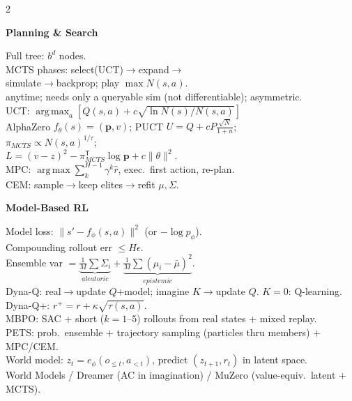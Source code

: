 \documentclass[a4paper]{article}
\newcommand{\hd}[1]{%
  \par\addvspace{3.6pt}%
  {\color{accent}\bfseries\small #1}\par
  \vspace{-4pt}{\color{accent!45}\rule{\linewidth}{0.4pt}}\par\vspace{1.2pt}}
\newcommand{\argmax}{\operatorname*{arg\,max}}
\newcommand{\T}{^{\mathsf{T}}}
\newcommand{\norm}[1]{\lVert #1 \rVert}
\begin{document}
\begin{multicols}{2}
\hd{Planning \& Search}
Full tree: $b^d$ nodes.\\
MCTS phases: select(UCT)$\to$expand$\to$\\simulate$\to$backprop; play $\max N(s,a)$.\\
anytime; needs only a queryable sim (not differentiable); asymmetric.\\
UCT: $\argmax_a[Q(s,a)+c\sqrt{\ln N(s)/N(s,a)}]$\\
AlphaZero $f_\theta(s){=}(\mathbf p,v)$; PUCT $U=Q+cP\frac{\sqrt N}{1+n}$;\\
$\pi_{MCTS}\propto N(s,a)^{1/\tau}$;\\
$L=(v-z)^2-\pi_{MCTS}\T\log\mathbf p+c\norm\theta^2$.\\
MPC: $\argmax\sum_{k}^{H-1}\gamma^k\hat r$, exec.\ first action, re-plan.\\
CEM: sample$\to$keep elites$\to$refit $\mu,\Sigma$.

\hd{Model-Based RL}
Model loss: $\norm{s'-f_\phi(s,a)}^2$ (or $-\log p_\phi$).\\
Compounding rollout err $\le H\epsilon$.\\
Ensemble var $=\underbrace{\tfrac1M\sum\Sigma_i}_{aleatoric}+\underbrace{\tfrac1M\sum(\mu_i-\bar\mu)^2}_{epistemic}$.\\
Dyna-Q: real$\to$update $Q$+model; imagine $K$$\to$update $Q$. $K{=}0$: Q-learning.\\
Dyna-Q+: $r^+=r+\kappa\sqrt{\tau(s,a)}$.\\
MBPO: SAC + short ($k{=}1$–$5$) rollouts from real states + mixed replay.\\
PETS: prob.\ ensemble $+$ trajectory sampling (particles thru members) $+$ MPC/CEM.\\
World model: $z_t{=}e_\phi(o_{\le t},a_{<t})$, predict $(z_{t+1},r_t)$ in latent space.\\
World Models / Dreamer (AC in imagination) / MuZero (value-equiv.\ latent $+$ MCTS).

\end{multicols}
\end{document}
